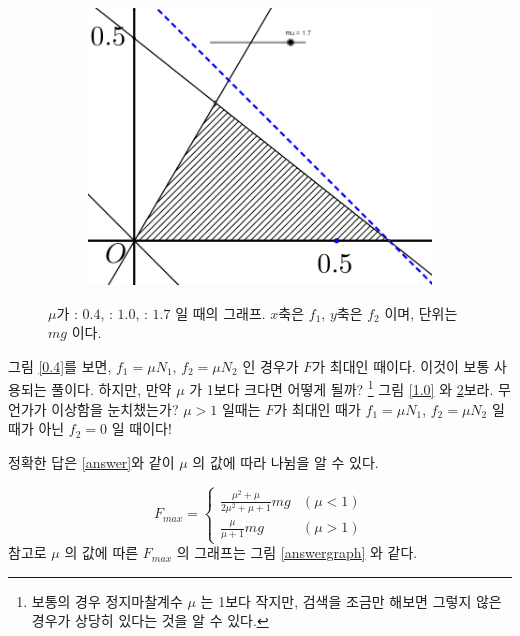\documentclass[11pt]{article}
\begin{document}
\begin{figure}[t]
\begin{subfigure}[b]{0.3\linewidth}
		\centering\includegraphics[width=\linewidth]{mu17_v3.png}
		\caption{\label{1.4}}
	\end{subfigure}
	\caption{$\mu$가  : $0.4$,  : $1.0$,  : $1.7$ 일 때의 그래프. $x$축은 $f_{1}$, $y$축은 $f_{2}$ 이며, 단위는 $mg$ 이다.}
\end{figure}

그림 \ref{0.4}를 보면, $ f_{1}=\mu N_{1} $, $ f_{2}=\mu N_{2} $ 인 경우가 $F$가 최대인 때이다. 이것이 보통 사용되는 풀이다. 하지만, 만약 $\mu$ 가 1보다 크다면 어떻게 될까? \footnote{보통의 경우 정지마찰계수 $\mu$ 는 1보다 작지만, 검색을 조금만 해보면 그렇지 않은 경우가 상당히 있다는 것을 알 수 있다.} 그림 \ref{1.0} 와 \ref{1.4}\를 보라. 무언가가 이상함을 눈치챘는가? $\mu > 1$ 일때는 $F$가 최대인 때가 $ f_{1}=\mu N_{1} $, $ f_{2}=\mu N_{2} $ 일 때가 아닌 $f_{2}=0$ 일 때이다!

정확한 답은 \eqref{answer}와 같이 $\mu$ 의 값에 따라 나뉨을 알 수 있다.

\begin{equation} \label{answer}
F_{max} = 
\begin{cases}
\frac{\mu^{2}+\mu}{2\mu^{2}+\mu+1} mg & (\mu < 1)\\ 
\frac{\mu}{\mu+1} mg & (\mu > 1) 
\end{cases}
\end{equation}
참고로 $\mu$ 의 값에 따른 $F_{max}$ 의 그래프는 그림 \ref{answergraph} 와 같다.
\end{document}
